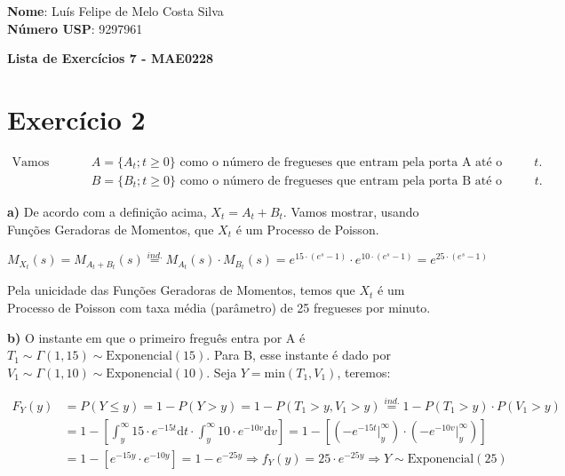 \documentclass[12pt]{article}
\begin{document}
	
	\textbf{Nome}: Luís Felipe de Melo Costa Silva \\
	\textbf{Número USP}: 9297961 
	
	\begin{center}
		\LARGE \bf
		Lista de Exercícios 7 - MAE0228
	\end{center}
	 
	 \section*{Exercício 2}
	 
	 \begin{equation*}
	 	 \begin{split}
	 	 \text{Vamos definir: } & A = \{A_t; t\geq0\} \text{ como o número de fregueses que entram pela porta A até o instante } t.\\
	 	                        & B = \{B_t; t\geq0\} \text{ como o número de fregueses que entram pela porta B até o instante } t.
	 	 \end{split}
	 \end{equation*}
	 
	 \textbf{a)} De acordo com a definição acima, $X_t = A_t + B_t$. Vamos mostrar, usando Funções Geradoras de Momentos, que $ X_t $ é um Processo de Poisson.
	 
	 \begin{equation*}
	 	M_{X_t}(s) = M_{A_t+B_t}(s) \stackrel{ind.}{=} M_{A_t}(s) \cdot M_{B_t}(s) = e^{15\cdot(e^s-1)} \cdot e^{10\cdot(e^s-1)} = e^{25\cdot(e^s-1)} 
	 \end{equation*}
	 
	Pela unicidade das Funções Geradoras de Momentos, temos que $ X_t $ é um Processo de Poisson com taxa média (parâmetro) de 25 fregueses por minuto.
	
	\textbf{b)} O instante em que o primeiro freguês entra por A é $ T_1 \sim \Gamma(1, 15) \sim \text{Exponencial}(15)$. Para B, esse instante é dado por $ V_1 \sim \Gamma(1, 10) \sim \text{Exponencial}(10)$. Seja $Y = \text{min}(T_1, V_1)$, teremos:
	
	\begin{equation*}
		\begin{split}
		F_Y(y) & = P(Y \leq y) = 1 - P(Y > y) = 1 - P(T_1 > y, V_1 > y) \stackrel{ind.}{=} 1 - P(T_1 > y) \cdot P(V_1 > y) \\
		& = 1 - \left[\int_{y}^{\infty}15\cdot e^{-15t} \text{d}t \cdot \int_{y}^{\infty}10\cdot e^{-10v} \text{d}v\right] =  1 - \left[\left(-e^{-15t}\rvert_{y}^{\infty}\right) \cdot \left(-e^{-10v}\rvert_{y}^{\infty}\right)\right] \\
		& = 1 - \left[e^{-15y} \cdot e^{-10y}\right] = 1 - e^{-25y} \Rightarrow f_Y(y) = 25 \cdot e^{-25y} \Rightarrow Y \sim \text{Exponencial}(25)
		\end{split}
	\end{equation*}
	
\end{document}
